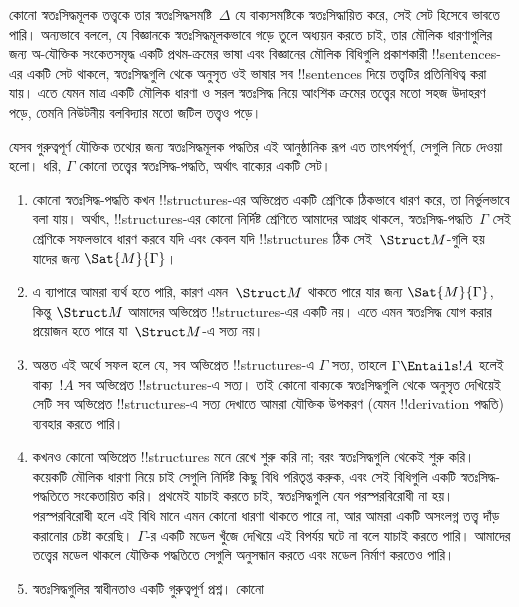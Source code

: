 \documentclass[../../../include/open-logic-section]{subfiles}
\begin{document}
\begin{explain}
কোনো স্বতঃসিদ্ধমূলক তত্ত্বকে তার স্বতঃসিদ্ধসমষ্টি~$\Delta$ যে
বাক্যসমষ্টিকে স্বতঃসিদ্ধায়িত করে, সেই সেট হিসেবে ভাবতে পারি।
অন্যভাবে বললে, যে বিজ্ঞানকে স্বতঃসিদ্ধমূলকভাবে গড়ে তুলে অধ্যয়ন করতে
চাই, তার মৌলিক ধারণাগুলির জন্য অ-যৌক্তিক সংকেতসমৃদ্ধ একটি প্রথম-ক্রমের
ভাষা এবং বিজ্ঞানের মৌলিক বিধিগুলি প্রকাশকারী !!{sentence}s-এর একটি সেট
থাকলে, স্বতঃসিদ্ধগুলি থেকে অনুসৃত ওই ভাষার সব !!{sentence}s দিয়ে
তত্ত্বটির প্রতিনিধিত্ব করা যায়। এতে যেমন মাত্র একটি মৌলিক ধারণা ও
সরল স্বতঃসিদ্ধ নিয়ে আংশিক ক্রমের তত্ত্বের মতো সহজ উদাহরণ পড়ে, তেমনি
নিউটনীয় বলবিদ্যার মতো জটিল তত্ত্বও পড়ে।

যেসব গুরুত্বপূর্ণ যৌক্তিক তথ্যের জন্য স্বতঃসিদ্ধমূলক পদ্ধতির এই
আনুষ্ঠানিক রূপ এত তাৎপর্যপূর্ণ, সেগুলি নিচে দেওয়া হলো। ধরি,
$\Gamma$ কোনো তত্ত্বের স্বতঃসিদ্ধ-পদ্ধতি, অর্থাৎ বাক্যের
একটি সেট।
\begin{enumerate}
\item কোনো স্বতঃসিদ্ধ-পদ্ধতি কখন !!{structure}s-এর অভিপ্রেত একটি
  শ্রেণিকে ঠিকভাবে ধারণ করে, তা নির্ভুলভাবে বলা যায়। অর্থাৎ,
  !!{structure}s-এর কোনো নির্দিষ্ট শ্রেণিতে আমাদের আগ্রহ থাকলে,
  স্বতঃসিদ্ধ-পদ্ধতি~$\Gamma$ সেই শ্রেণিকে সফলভাবে ধারণ করবে যদি এবং
  কেবল যদি !!{structure}s ঠিক সেই~$\Struct M$-গুলি হয় যাদের জন্য
  $\Sat{M}{\Gamma}$।
\item এ ব্যাপারে আমরা ব্যর্থ হতে পারি, কারণ এমন~$\Struct M$ থাকতে পারে
  যার জন্য $\Sat{M}{\Gamma}$, কিন্তু $\Struct M$ আমাদের অভিপ্রেত
  !!{structure}s-এর একটি নয়। এতে এমন স্বতঃসিদ্ধ যোগ করার প্রয়োজন হতে
  পারে যা~$\Struct M$-এ সত্য নয়।
\item অন্তত এই অর্থে সফল হলে যে, সব অভিপ্রেত !!{structure}s-এ
  $\Gamma$ সত্য, তাহলে $\Gamma \Entails !A$ হলেই বাক্য~$!A$ সব অভিপ্রেত
  !!{structure}s-এ সত্য। তাই কোনো বাক্যকে স্বতঃসিদ্ধগুলি থেকে অনুসৃত
  দেখিয়েই সেটি সব অভিপ্রেত !!{structure}s-এ সত্য দেখাতে আমরা যৌক্তিক
  উপকরণ (যেমন !!{derivation} পদ্ধতি) ব্যবহার করতে পারি।
\item কখনও কোনো অভিপ্রেত !!{structure}s মনে রেখে শুরু করি না; বরং
  স্বতঃসিদ্ধগুলি থেকেই শুরু করি। কয়েকটি মৌলিক ধারণা নিয়ে চাই সেগুলি
  নির্দিষ্ট কিছু বিধি পরিতৃপ্ত করুক, এবং সেই বিধিগুলি একটি
  স্বতঃসিদ্ধ-পদ্ধতিতে সংকেতায়িত করি। প্রথমেই যাচাই করতে চাই,
  স্বতঃসিদ্ধগুলি যেন পরস্পরবিরোধী না হয়। পরস্পরবিরোধী হলে এই বিধি
  মানে এমন কোনো ধারণা থাকতে পারে না, আর আমরা একটি অসংলগ্ন তত্ত্ব
  দাঁড় করানোর চেষ্টা করেছি। $\Gamma$-র একটি মডেল খুঁজে দেখিয়ে এই
  বিপর্যয় ঘটে না বলে যাচাই করতে পারি। আমাদের তত্ত্বের মডেল থাকলে
  যৌক্তিক পদ্ধতিতে সেগুলি অনুসন্ধান করতে এবং মডেল নির্মাণ করতেও পারি।
\item স্বতঃসিদ্ধগুলির স্বাধীনতাও একটি গুরুত্বপূর্ণ প্রশ্ন। কোনো

\end{enumerate}
\end{explain}
\end{document}
